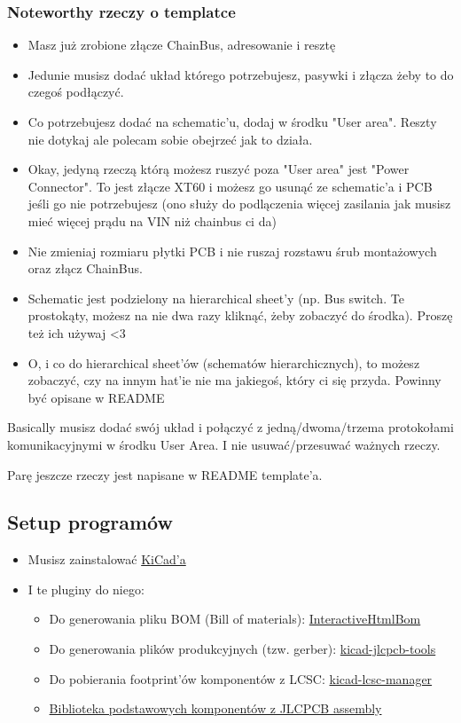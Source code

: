 \documentclass[b5paper, 10pt, twoside]{book}
\begin{document}
\subsubsection{Noteworthy rzeczy o templatce}
\begin{itemize}
  \item Masz już zrobione złącze ChainBus, adresowanie i resztę
  \item Jedunie musisz dodać układ którego potrzebujesz, pasywki i złącza żeby to do czegoś podłączyć.
  \item Co potrzebujesz dodać na schematic'u, dodaj w środku "User area". Reszty nie dotykaj ale polecam sobie obejrzeć jak to działa.
  \item Okay, jedyną rzeczą którą możesz ruszyć poza "User area" jest "Power Connector". To jest złącze XT60 i możesz go usunąć ze schematic'a i PCB jeśli go nie potrzebujesz (ono służy do podlączenia więcej zasilania jak musisz mieć więcej prądu na VIN niż chainbus ci da)
  \item Nie zmieniaj rozmiaru płytki PCB i nie ruszaj rozstawu śrub montażowych oraz złącz ChainBus.
  \item Schematic jest podzielony na hierarchical sheet'y (np. Bus switch. Te prostokąty, możesz na nie dwa razy kliknąć, żeby zobaczyć do środka). Proszę też ich używaj <3
  \item O, i co do hierarchical sheet'ów (schematów hierarchicznych), to możesz zobaczyć, czy na innym hat'ie nie ma jakiegoś, który ci się przyda. Powinny być opisane w README
\end{itemize}

Basically musisz dodać swój układ i połączyć z jedną/dwoma/trzema protokołami komunikacyjnymi w środku User Area. I nie usuwać/przesuwać ważnych rzeczy.

Parę jeszcze rzeczy jest napisane w README template'a.

\subsection{Setup programów}
\begin{itemize}
  \item Musisz zainstalować \href{https://www.kicad.org}{KiCad'a}
  \item I te pluginy do niego:
  \begin{itemize}
    \item Do generowania pliku BOM (Bill of materials): \href{https://github.com/openscopeproject/InteractiveHtmlBom}{InteractiveHtmlBom}
    \item Do generowania plików produkcyjnych (tzw. gerber): \href{https://github.com/Bouni/kicad-jlcpcb-tools}{kicad-jlcpcb-tools}
    \item Do pobierania footprint'ów komponentów z LCSC: \href{https://github.com/hulryung/kicad-lcsc-manager}{kicad-lcsc-manager}
    \item \href{https://github.com/CDFER/JLCPCB-Kicad-Library}{Biblioteka podstawowych komponentów z JLCPCB assembly}
  \end{itemize}
\end{itemize}
\end{document}
